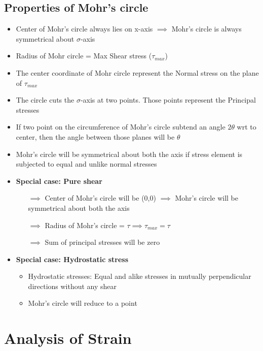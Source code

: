 \documentclass[8pt]{report}
\begin{document}
		\subsection{Properties of Mohr's circle}
			\begin{itemize}
				\item Center of Mohr's circle always lies on x-axis $\implies$ Mohr's circle is always symmetrical about $\sigma$-axis
				\item Radius of Mohr circle = Max Shear stress ($\tau_{max}$)
				\item The center coordinate of Mohr circle represent the Normal stress on the plane of $\tau_{max}$
				\item The circle cuts the $\sigma$-axis at two points. Those points represent the Principal stresses
				\item If two point on the circumference of Mohr's circle subtend an angle $2\theta$ wrt to center, then the angle between those planes will be $\theta$
				\item Mohr's circle will be symmetrical about both the axis if stress element is subjected to equal and unlike normal stresses
				\item \textbf{Special case: Pure shear} 
				\begin{itemize}
					\item[$\implies$] Center of Mohr's circle will be (0,0) $\implies$ Mohr's circle will be symmetrical about both the axis
					\item[$\implies$] Radius of Mohr's circle = $\tau \implies \tau_{max} = \tau$
					\item[$\implies$] Sum of principal stresses will be zero
				\end{itemize}
				\item \textbf{Special case: Hydrostatic stress}
					\begin{itemize}
						\item Hydrostatic stresses: Equal and alike stresses in mutually perpendicular directions without any shear
						\item Mohr's circle will reduce to a point
					\end{itemize}
			\end{itemize}\hrulefill
	\section{Analysis of Strain}
\end{document}
